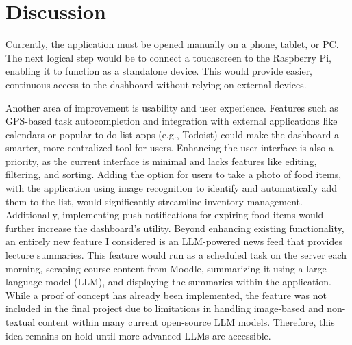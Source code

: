 \section{Discussion}\label{sec:Discussion}
Currently, the application must be opened manually on a phone, tablet, or PC. The next logical step would be to connect a touchscreen to the Raspberry Pi, enabling it to function as a standalone device. This would provide easier, continuous access to the dashboard without relying on external devices.

Another area of improvement is usability and user experience. Features such as GPS-based task autocompletion and integration with external applications like calendars or popular to-do list apps (e.g., Todoist) could make the dashboard a smarter, more centralized tool for users. Enhancing the user interface is also a priority, as the current interface is minimal and lacks features like editing, filtering, and sorting. Adding the option for users to take a photo of food items, with the application using image recognition to identify and automatically add them to the list, would significantly streamline inventory management. Additionally, implementing push notifications for expiring food items would further increase the dashboard's utility.
Beyond enhancing existing functionality, an entirely new feature I considered is an LLM-powered news feed that provides lecture summaries. This feature would run as a scheduled task on the server each morning, scraping course content from Moodle, summarizing it using a large language model (LLM), and displaying the summaries within the application. While a proof of concept has already been implemented, the feature was not included in the final project due to limitations in handling image-based and non-textual content within many current open-source LLM models. Therefore, this idea remains on hold until more advanced LLMs are accessible.
